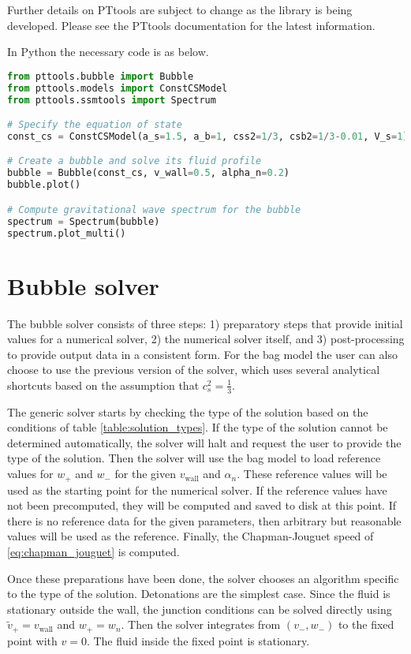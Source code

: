 Further details on PTtools are subject to change as the library is being developed.
Please see the PTtools documentation for the latest information.

In Python the necessary code is as below.
\begin{lstlisting}[language=Python]
from pttools.bubble import Bubble
from pttools.models import ConstCSModel
from pttools.ssmtools import Spectrum

# Specify the equation of state
const_cs = ConstCSModel(a_s=1.5, a_b=1, css2=1/3, csb2=1/3-0.01, V_s=1)

# Create a bubble and solve its fluid profile
bubble = Bubble(const_cs, v_wall=0.5, alpha_n=0.2)
bubble.plot()

# Compute gravitational wave spectrum for the bubble
spectrum = Spectrum(bubble)
spectrum.plot_multi()    
\end{lstlisting}


\section{Bubble solver}
The bubble solver consists of three steps: 1) preparatory steps that provide initial values for a numerical solver, 2) the numerical solver itself, and 3) post-processing to provide output data in a consistent form.
For the bag model the user can also choose to use the previous version of the solver,
which uses several analytical shortcuts based on the assumption that $c_s^2 = \frac{1}{3}$.

The generic solver starts by checking the type of the solution based on the conditions of table \ref{table:solution_types}.
If the type of the solution cannot be determined automatically, the solver will halt and request the user to provide the type of the solution.
Then the solver will use the bag model to load reference values for $w_+$ and $w_-$ for the given $v_\text{wall}$ and $\alpha_n$.
These reference values will be used as the starting point for the numerical solver.
If the reference values have not been precomputed, they will be computed and saved to disk at this point.
If there is no reference data for the given parameters, then arbitrary but reasonable values will be used as the reference.
Finally, the Chapman-Jouguet speed of \eqref{eq:chapman_jouguet} is computed.

Once these preparations have been done,
the solver chooses an algorithm specific to the type of the solution.
Detonations are the simplest case.
Since the fluid is stationary outside the wall,
the junction conditions can be solved directly using
$\tilde{v}_+ = v_\text{wall}$ and $w_+ = w_n$.
Then the solver integrates from $(v_-, w_-)$ to the fixed point with $v=0$.
The fluid inside the fixed point is stationary.


